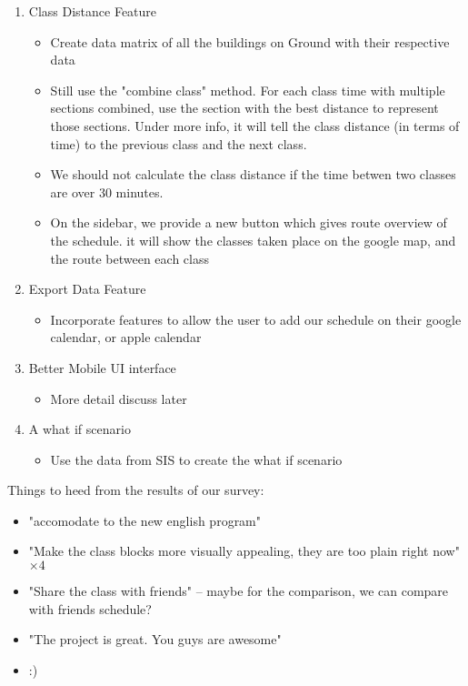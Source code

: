 \documentclass[dvips,12pt]{article}
\begin{document}
\begin{enumerate}
    \item Class Distance Feature
    \begin{itemize}
        \item Create data matrix of all the buildings on Ground with their respective data
        \item Still use the "combine class" method. For each class time with
        multiple sections combined, use the section with the best distance 
        to represent those sections. Under more info, it will tell the class distance
        (in terms of time) to the previous class and the next class. 
        \item We should not calculate the class distance if the time betwen two classes are over 30 minutes.
        \item On the sidebar, we provide a new button which gives route overview of the schedule. 
        it will show the classes taken place on the google map, and the route between each class
    \end{itemize}

    \item Export Data Feature
    \begin{itemize}
        \item Incorporate features to allow the user to add our schedule on their
        google calendar, or apple calendar
    \end{itemize}

    \item Better Mobile UI interface
    \begin{itemize}
        \item More detail discuss later
    \end{itemize}

    \item A what if scenario
    \begin{itemize}
        \item Use the data from SIS to create the what if scenario
    \end{itemize}
    
\end{enumerate}

Things to heed from the results of our survey:
\begin{itemize}
    \item "accomodate to the new english program"
    \item "Make the class blocks more visually appealing, they are too plain right now" \(\times4\)
    \item "Share the class with friends" -- maybe for the comparison, we can compare with friends schedule?
    \item "The project is great. You guys are awesome"
    \item :)
\end{itemize}
\end{document}
